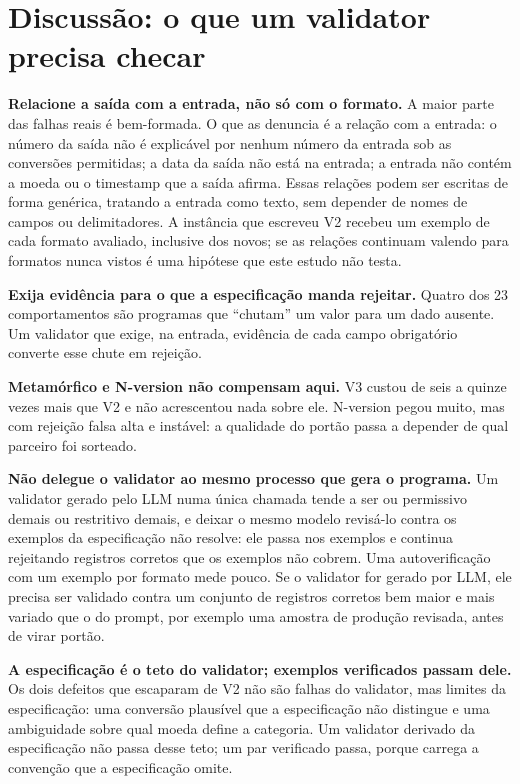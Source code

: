 \documentclass[sigconf,nonacm]{acmart}
\begin{document}
\section{Discussão: o que um validator precisa checar}

\textbf{Relacione a saída com a entrada, não só com o formato.} A maior parte das falhas reais é bem-formada. O que as denuncia é a relação com a entrada: o número da saída não é explicável por nenhum número da entrada sob as conversões permitidas; a data da saída não está na entrada; a entrada não contém a moeda ou o timestamp que a saída afirma. Essas relações podem ser escritas de forma genérica, tratando a entrada como texto, sem depender de nomes de campos ou delimitadores. A instância que escreveu V2 recebeu um exemplo de cada formato avaliado, inclusive dos novos; se as relações continuam valendo para formatos nunca vistos é uma hipótese que este estudo não testa.

\textbf{Exija evidência para o que a especificação manda rejeitar.} Quatro dos 23 comportamentos são programas que ``chutam'' um valor para um dado ausente. Um validator que exige, na entrada, evidência de cada campo obrigatório converte esse chute em rejeição.

\textbf{Metamórfico e N-version não compensam aqui.} V3 custou de seis a quinze vezes mais que V2 e não acrescentou nada sobre ele. N-version pegou muito, mas com rejeição falsa alta e instável: a qualidade do portão passa a depender de qual parceiro foi sorteado.

\textbf{Não delegue o validator ao mesmo processo que gera o programa.} Um validator gerado pelo LLM numa única chamada tende a ser ou permissivo demais ou restritivo demais, e deixar o mesmo modelo revisá-lo contra os exemplos da especificação não resolve: ele passa nos exemplos e continua rejeitando registros corretos que os exemplos não cobrem. Uma autoverificação com um exemplo por formato mede pouco. Se o validator for gerado por LLM, ele precisa ser validado contra um conjunto de registros corretos bem maior e mais variado que o do prompt, por exemplo uma amostra de produção revisada, antes de virar portão.

\textbf{A especificação é o teto do validator; exemplos verificados passam dele.} Os dois defeitos que escaparam de V2 não são falhas do validator, mas limites da especificação: uma conversão plausível que a especificação não distingue e uma ambiguidade sobre qual moeda define a categoria. Um validator derivado da especificação não passa desse teto; um par verificado passa, porque carrega a convenção que a especificação omite.
\end{document}
